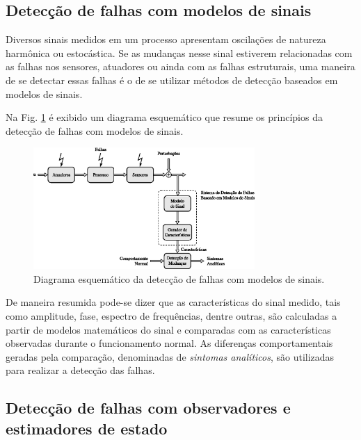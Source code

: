 \subsection{Detecção de falhas com modelos de sinais}
Diversos sinais medidos em um processo apresentam oscilações de natureza
harmônica ou estocástica. Se as mudanças nesse sinal estiverem relacionadas com
as falhas nos sensores, atuadores ou ainda com as falhas estruturais, uma
maneira de se detectar essas falhas é o de se utilizar métodos de detecção
baseados em modelos de sinais.

Na Fig. \ref{fig:detec_mod_sin} é exibido um diagrama esquemático que resume os
princípios da detecção de falhas com modelos de sinais.

\begin{figure}[htb]
\centering
    \includegraphics[width=0.75\textwidth]{imgs/detec_diag/eps/detec_mod_sin}
    \caption{Diagrama esquemático da detecção de falhas com modelos de sinais.}
    \label{fig:detec_mod_sin}
\end{figure}

De maneira resumida pode-se dizer que as características do sinal medido, tais
como amplitude, fase, espectro de frequências, dentre outras, são calculadas a
partir de modelos matemáticos do sinal e comparadas com as características
observadas durante o funcionamento normal. As diferenças comportamentais geradas
pela comparação, denominadas de {\it sintomas analíticos}, são utilizadas para
realizar a detecção das falhas.

\subsection{Detecção de falhas com observadores e estimadores de estado}

